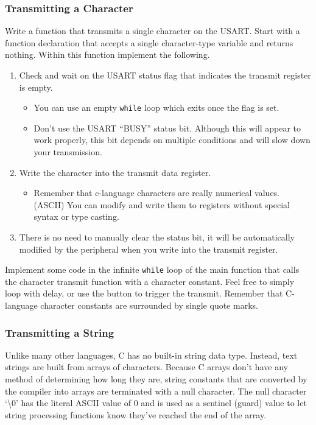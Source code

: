 \documentclass[11pt,fleqn]{book} %
\begin{document}
\subsubsection{Transmitting a Character}

Write a function that transmits a single character on the USART. Start with a function declaration that accepts a single character-type variable and returns nothing. Within this function implement the following.

\begin{enumerate}
    \item Check and wait on the USART status flag that indicates the transmit register is empty.
    \begin{itemize}
        \item You can use an empty \texttt{while} loop which exits once the flag is set. 
        \item Don't use the USART ``BUSY'' status bit. Although this will appear to work properly, this bit depends on multiple conditions and will slow down your transmission. 
    \end{itemize}
    \item Write the character into the transmit data register. 
    \begin{itemize}
        \item Remember that c-language characters are really numerical values. (ASCII) You can modify and write them to registers without special syntax or type casting.  
    \end{itemize}
    \item There is no need to manually clear the status bit, it will be automatically modified by the peripheral when you write into the transmit register.
\end{enumerate}

Implement some code in the infinite \texttt{while} loop of the main function that calls the character transmit function with a character constant. Feel free to simply loop with delay, or use the button to trigger the transmit. Remember that C-language character constants are surrounded by single quote marks.

\subsubsection{Transmitting a String}
Unlike many other languages, C has no built-in string data type. Instead, text strings are built from arrays of characters. Because C arrays don't have any method of determining how long they are, string constants that are converted by the compiler into arrays are terminated with a null character. The null character `{\textbackslash}0' has the literal ASCII value of 0 and is used as a sentinel (guard) value to let string processing functions know they've reached the end of the array. 
\end{document}
